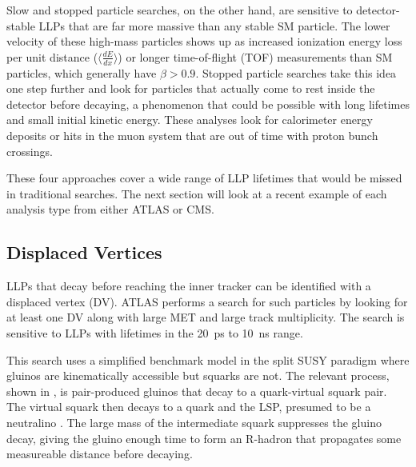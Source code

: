 \documentclass[12pt]{article}
\begin{document}
    Slow and stopped particle searches, on the other hand, are sensitive to detector-stable LLPs that are far more massive than any stable SM particle. The lower velocity of these high-mass particles shows up as increased ionization energy loss per unit distance ($\langle\frac{dE}{dx}\rangle$) or longer time-of-flight (TOF) measurements than SM particles, which generally have $\beta > \num{0.9}$. Stopped particle searches take this idea one step further and look for particles that actually come to rest inside the detector before decaying, a phenomenon that could be possible with long lifetimes and small initial kinetic energy. These analyses look for calorimeter energy deposits or hits in the muon system that are out of time with proton bunch crossings.

    These four approaches cover a wide range of LLP lifetimes that would be missed in traditional searches. The next section will look  at a recent example of each analysis type from either ATLAS or CMS.

\subsection{Displaced Vertices}
    LLPs that decay before reaching the inner tracker can be identified with a displaced vertex (DV). ATLAS performs a search for such particles by looking for at least one DV along with large MET and large track multiplicity. The search is sensitive to LLPs with lifetimes in the \SI{20}{\pico\s} to \SI{10}{\nano\s} range.

    This search uses a simplified benchmark model in the split SUSY paradigm where gluinos are kinematically accessible but squarks are not. The relevant process, shown in , is pair-produced gluinos that decay to a quark-virtual squark pair. The virtual squark then decays to a quark and the LSP, presumed to be a neutralino . The large mass of the intermediate squark suppresses the gluino decay, giving the gluino enough time to form an R-hadron that propagates some measureable distance before decaying. 
\end{document}
